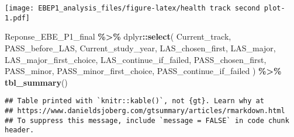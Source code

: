\documentclass[
]{article}
\newenvironment{Shaded}{\begin{snugshade}}{\end{snugshade}}
\newcommand{\FunctionTok}[1]{\textcolor[rgb]{0.13,0.29,0.53}{\textbf{#1}}}
\newcommand{\NormalTok}[1]{#1}
\newcommand{\SpecialCharTok}[1]{\textcolor[rgb]{0.81,0.36,0.00}{\textbf{#1}}}
\begin{document}
\texttt{[image: EBEP1\_analysis\_files/figure-latex/health track second plot-1.pdf]}

\begin{Shaded}
\begin{Highlighting}[]
\NormalTok{Reponse\_EBE\_P1\_final }\SpecialCharTok{\%\textgreater{}\%}
\NormalTok{  dplyr}\SpecialCharTok{::}\FunctionTok{select}\NormalTok{(}
\NormalTok{    Current\_track,}
\NormalTok{    PASS\_before\_LAS,}
\NormalTok{    Current\_study\_year,}
\NormalTok{    LAS\_chosen\_first,}
\NormalTok{    LAS\_major,}
\NormalTok{    LAS\_major\_first\_choice,}
\NormalTok{    LAS\_continue\_if\_failed,}
\NormalTok{    PASS\_chosen\_first,}
\NormalTok{    PASS\_minor,}
\NormalTok{    PASS\_minor\_first\_choice,}
\NormalTok{    PASS\_continue\_if\_failed}
\NormalTok{  ) }\SpecialCharTok{\%\textgreater{}\%} \FunctionTok{tbl\_summary}\NormalTok{()}
\end{Highlighting}
\end{Shaded}

\begin{verbatim}
## Table printed with `knitr::kable()`, not {gt}. Learn why at
## https://www.danieldsjoberg.com/gtsummary/articles/rmarkdown.html
## To suppress this message, include `message = FALSE` in code chunk header.
\end{verbatim}
\end{document}
